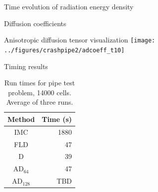 \documentclass{beamer}
\begin{document}
\begin{frame}{Time evolution of radiation energy density}
  \centering%
  \par
\end{frame}
\begin{frame}{Diffusion coefficients}
  \centering%
  \par
\end{frame}
\begin{frame}{Anisotropic diffusion tensor visualization}
  \centering%
  \texttt{[image: ../figures/crashpipe2/adcoeff\_t10]}%
  \par
\end{frame}
\begin{frame}{Timing results}
  \begin{table}[htb]
    \centering
    \begin{tabular}{cr}
      Method & Time (s) \\ \hline
      IMC & 1880 \\
      FLD & 47 \\
      D   & 39 \\
      AD$_{64}$ & 47 \\
      AD$_{128}$ & TBD
    \end{tabular}
    \caption{Run times for pipe test problem, 14000 cells. Average of three
    runs.}
    \label{tab:pipeTiming}
  \end{table}
\end{frame}
\end{document}
